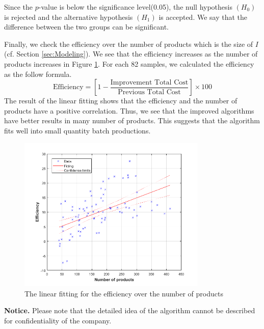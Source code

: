 Since the $p$-value is below the significance level(0.05), the null hypothesis $(H_{0})$ is rejected and the alternative hypothesis $(H_{1})$ is accepted. We say that the difference between the two groups can be significant.

Finally, we check the efficiency over the number of products which is the size of $I$(cf. Section \ref{sec:Modeling}).
We see that the efficiency increases as the number of products increases in Figure \ref{fig:LinearFitting}.
For each 82 samples, we calculated the efficiency as the follow formula.
\begin{equation}
	\textrm{Efficiency} = \left[1-\frac{\textrm{Improvement~Total~Cost}}{\textrm{Previous~Total~Cost}}\right]\times 100
\end{equation}
The result of the linear fitting shows that the efficiency and the number of products have a positive correlation.
Thus, we see that the improved algorithms have better results in many number of products.
This suggests that the algorithm fits well into small quantity batch productions.


\begin{figure}[h!]
	\centering
	\includegraphics[width=9cm]{Graph_3.png}
	\caption{The linear fitting for the efficiency over the number of products}
	\label{fig:LinearFitting}       %
\end{figure}


{\bf Notice.} Please note that the detailed idea of the algorithm cannot be described for confidentiality of the company.


